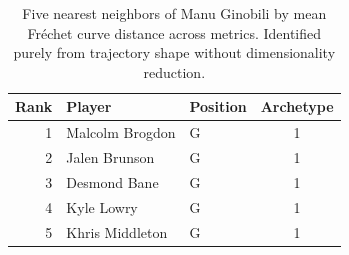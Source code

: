 \begin{table}[htbp]
  \centering\small
  \begin{tabular}{rllc}
    \toprule
    Rank & Player & Position & Archetype \\
    \midrule
    1 & Malcolm Brogdon & G & 1 \\
    2 & Jalen Brunson & G & 1 \\
    3 & Desmond Bane & G & 1 \\
    4 & Kyle Lowry & G & 1 \\
    5 & Khris Middleton & G & 1 \\
    \bottomrule
  \end{tabular}
  \caption{Five nearest neighbors of Manu Ginobili by mean Fr\'{e}chet curve distance across metrics. Identified purely from trajectory shape without dimensionality reduction.}
  \label{tab:Manu_Ginobili_frechet_curve_neighbors}
\end{table}

